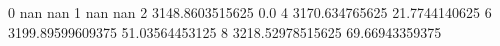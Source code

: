 0 nan nan
1 nan nan
2 3148.8603515625 0.0
4 3170.634765625 21.7744140625
6 3199.89599609375 51.03564453125
8 3218.52978515625 69.66943359375
